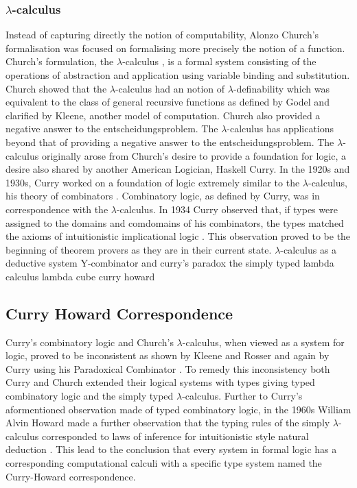 \subsubsection{$\lambda$-calculus}
Instead of capturing directly the notion of computability, Alonzo Church's
formalisation was focused on formalising more precisely the notion of a function.
Church's formulation, the $\lambda$-calculus \cite{church1932set}, is a formal system consisting of
the operations of abstraction and application using variable binding and
substitution. Church showed that the $\lambda$-calculus had an notion of
$\lambda$-definability \cite{church1936unsolvable} which was equivalent to the class of general recursive
functions \cite{kleene1936general} as defined by Godel and clarified by Kleene, another model of computation.
Church also provided a negative answer to the entscheidungsproblem. The
$\lambda$-calculus has applications beyond that of providing a negative answer
to the entscheidungsproblem. The $\lambda$-calculus originally arose from Church's
desire to provide a foundation for logic, a desire also shared by another
American Logician, Haskell Curry. In the 1920s and 1930s, Curry worked on a
foundation of logic extremely similar to the $\lambda$-calculus, his theory of
combinators \cite{curry1930grundlagen}. Combinatory logic, as defined by Curry, was in correspondence with
the $\lambda$-calculus. In 1934 Curry observed that, if types were assigned to
the domains and comdomains of his combinators, the types matched the axioms of
intuitionistic implicational logic \cite{curry1934functionality}. This observation proved to be the beginning
of theorem provers as they are in their current state.
$\lambda$-calculus as a deductive system
Y-combinator and curry's paradox
the simply typed lambda calculus
lambda cube
curry howard

\subsection{Curry Howard Correspondence}
Curry's combinatory logic and Church's $\lambda$-calculus, when viewed as a
system for logic, proved to be inconsistent as shown by Kleene and Rosser
\cite{kleene1935inconsistency} and
again by Curry using his Paradoxical Combinator \cite{curry1941paradox}. To remedy this inconsistency
both Curry and Church extended their logical systems with types giving typed
combinatory logic and the simply typed $\lambda$-calculus. Further to Curry's
aformentioned observation made of typed combinatory logic, in the 1960s William
Alvin Howard  made a further observation that the typing rules of the simply
$\lambda$-calculus corresponded to laws of inference for intuitionistic style
natural deduction \cite{howard1980formulae}. This lead to the conclusion that every system in
formal logic has a corresponding computational calculi with a specific type
system named the Curry-Howard correspondence.

